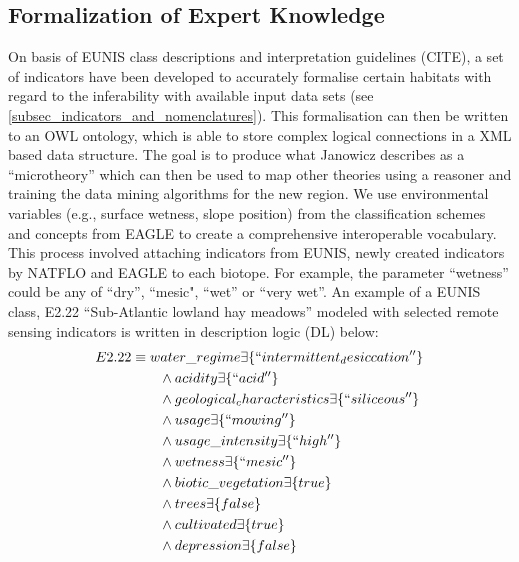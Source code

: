 \documentclass[authoryear, review,12pt,number]{elsarticle}
\begin{document}
\subsection{Formalization of Expert Knowledge}
On basis of EUNIS class descriptions and interpretation guidelines (CITE), a
set of indicators have been developed to accurately formalise certain habitats
with regard to the inferability with available input data sets (see
\ref{subsec_indicators_and_nomenclatures}). This formalisation can then be
written to an OWL ontology, which is able to store complex logical connections
in a XML based data structure.  The goal is to produce what Janowicz describes
as a ``microtheory'' \citep{Janowicz2012} which can then be used to map other
theories using a reasoner and training the data mining algorithms for the new
region. We use environmental variables (e.g., surface wetness, slope position)
from the classification schemes and concepts from EAGLE to create a
comprehensive interoperable vocabulary. This process involved attaching
indicators from EUNIS, newly created indicators by NATFLO and EAGLE to each
biotope. For example, the parameter ``wetness'' could be any of ``dry'',
``mesic", ``wet'' or ``very wet''. An example of a EUNIS
class, E2.22 ``Sub-Atlantic lowland hay meadows'' modeled with selected remote
sensing indicators is written in description logic (DL) below:
\begin{align*}
E2.22 &\equiv water\_regime \exists \{``intermittent_desiccation''\} \\
&\qquad {} \land acidity \exists \{``acid''\} \\
&\qquad {} \land geological_characteristics \exists \{``siliceous''\}\\
&\qquad {} \land usage \exists \{``mowing''\} \\
&\qquad {} \land usage\_intensity \exists \{``high''\} \\
&\qquad {} \land wetness \exists \{``mesic''\} \\
&\qquad {} \land biotic\_vegetation \exists \{true\}\\ 
&\qquad {} \land trees \exists \{false\} \\
&\qquad {} \land cultivated \exists \{true\}\\
&\qquad {} \land depression \exists \{false\}\\
\end{align*}

\end{document}

